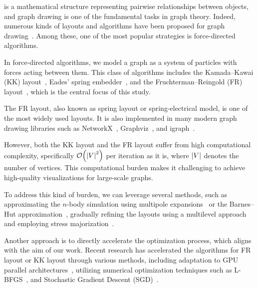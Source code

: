 \documentclass[dvipdfmx,journal]{IEEEtran}
\begin{document}
 is a mathematical structure representing pairwise relationships between objects, and graph drawing is one of the fundamental tasks in graph theory.
Indeed, numerous kinds of layouts and algorithms have been proposed for graph drawing~\cite{tutteHowDrawGraph1963,chrobakLineartimeAlgorithmDrawing1995,sugiyamaMethodsVisualUnderstanding1981,ghassemitoosiSimulatedAnnealingPreProcessing2016}.
Among these, one of the most popular strategies is force-directed algorithms.

In force-directed algorithms, we model a graph as a system of particles with forces acting between them.
This class of algorithms includes the Kamada--Kawai (KK) layout~\cite{kamadaAlgorithmDrawingGeneral1989},
Eades' spring embedder~\cite{eades1984heuristic}, and the Fruchterman--Reingold (FR) layout~\cite{fruchtermanGraphDrawingForcedirected1991,kobourovSpringEmbeddersForce2012}, which is the central focus of this study.

The FR layout, also known as spring layout or spring-electrical model, is one of the most widely used layouts.
It is also implemented in many modern graph drawing libraries such as NetworkX~\cite{hagberg2008exploring}, Graphviz~\cite{ellsonGraphvizOpenSource2002}, and igraph~\cite{csardiIgraphSoftwarePackage2006}.

However, both the KK layout and the FR layout suffer from high computational complexity, specifically $\order{\abs{V}^2}$ per iteration as it is, where $\abs{V}$ denotes the number of vertices.
This computational burden makes it challenging to achieve high-quality visualizations for large-scale graphs.

To address this kind of burden, we can leverage several methods, such as approximating the $n$-body simulation using multipole expansions~\cite{greengardFastAlgorithmParticle1987} or the Barnes--Hut approximation~\cite{barnesHierarchicalLogForcecalculation1986}, gradually refining the layouts using a multilevel approach~\cite{Hu2006EfficientHF} and employing stress majorization~\cite{gansnerGraphDrawingStress2005}.

Another approach is to directly accelerate the optimization process, which aligns with the aim of our work.
Recent research has accelerated the algorithms for FR layout or KK layout through various methods, including adaptation to GPU parallel architectures~\cite{gajdosParallelFruchtermanReingold2016}, utilizing numerical optimization techniques such as L-BFGS~\cite{6183577}, and Stochastic Gradient Descent (SGD)~\cite{8419285}.
\end{document}
